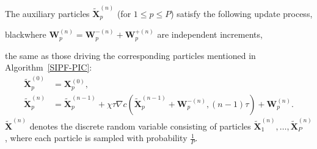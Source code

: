 \documentclass[review,onefignum,onetabnum]{siamart250211}
\begin{document}
\begin{definition}
\label{def:br_cp}
The auxiliary particles \( \widetilde{\mathbf{X}}_p^{(n)} \) (for \( 1 \leq p \leq P \)) satisfy the following update process, \begin{color}{black}where \(\mathbf{W}_p^{(n)}=\mathbf{W}_p^{-(n)}+\mathbf{W}_p^{+(n)}\) are independent increments,\end{color} the same as those driving the corresponding particles mentioned in Algorithm~\ref{SIPF-PIC}:
\begin{equation}
\begin{aligned}
\widetilde{\mathbf{X}}_p^{(0)} &= \mathbf{X}_p^{(0)}, \\
\widetilde{\mathbf{X}}_p^{(n)} &= \widetilde{\mathbf{X}}_p^{(n-1)} + \chi \tau \nabla c(\widetilde{\mathbf{X}}_p^{(n-1)}+\mathbf{W}_p^{-(n)},(n-1)\tau) + \mathbf{W}_p^{(n)}.
\end{aligned}
\end{equation}
\( \widetilde{\mathbf{X}}^{(n)} \) denotes the discrete random variable consisting of particles \( \widetilde{\mathbf{X}}_1^{(n)}, \ldots, \widetilde{\mathbf{X}}_P^{(n)} \), where each particle is sampled with  probability \( \frac{1}{P} \).


\end{definition}
\end{document}
